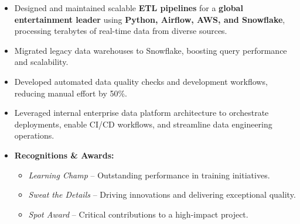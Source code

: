 \begin{itemize}[leftmargin=0.5cm]

    \item Designed and maintained scalable \textbf{ETL pipelines} for a \textbf{global entertainment leader} using \textbf{Python, Airflow, AWS, and Snowflake}, processing terabytes of real-time data from diverse sources.
    \item Migrated legacy data warehouses to Snowflake, boosting query performance and scalability.
    \item Developed automated data quality checks and development workflows, reducing manual effort by 50\%.
    \item Leveraged internal enterprise data platform architecture to orchestrate deployments, enable CI/CD workflows, and streamline data engineering operations.
    
    \item \textbf{Recognitions \& Awards:}
    \begin{itemize}[leftmargin=0.5cm]
        \item \textit{Learning Champ} – Outstanding performance in training initiatives.
        \item \textit{Sweat the Details} – Driving innovations and delivering exceptional quality.
        \item \textit{Spot Award} – Critical contributions to a high-impact project.
    \end{itemize}

\end{itemize}

